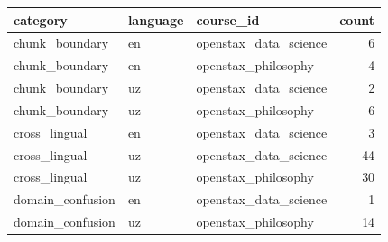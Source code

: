 \begin{tabular}{lllr}
\toprule
category & language & course_id & count \\
\midrule
chunk_boundary & en & openstax_data_science & 6 \\
chunk_boundary & en & openstax_philosophy & 4 \\
chunk_boundary & uz & openstax_data_science & 2 \\
chunk_boundary & uz & openstax_philosophy & 6 \\
cross_lingual & en & openstax_data_science & 3 \\
cross_lingual & uz & openstax_data_science & 44 \\
cross_lingual & uz & openstax_philosophy & 30 \\
domain_confusion & en & openstax_data_science & 1 \\
domain_confusion & uz & openstax_philosophy & 14 \\
\bottomrule
\end{tabular}

